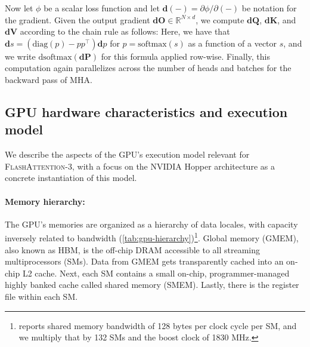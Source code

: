 \documentclass{article}
\newcommand{\diag}{\mathrm{diag}}
\newcommand{\softmax}{\mathrm{softmax}}
\newcommand{\dsoftmax}{\mathrm{dsoftmax}}
\newcommand{\vQ}{\mathbf{Q}}
\newcommand{\vK}{\mathbf{K}}
\newcommand{\vV}{\mathbf{V}}
\newcommand{\vdQ}{\mathbf{dQ}}
\newcommand{\vdK}{\mathbf{dK}}
\newcommand{\vdV}{\mathbf{dV}}
\newcommand{\vdS}{\mathbf{dS}}
\newcommand{\vP}{\mathbf{P}}
\newcommand{\vdP}{\mathbf{dP}}
\newcommand{\vdO}{\mathbf{dO}}
\newcommand{\fat}{\textsc{FlashAttention-3}\xspace}  %
\begin{document}
Now let $\phi$ be a scalar loss function and let $\mathbf{d}(-) = \partial \phi / \partial (-)$ be notation for the gradient.
Given the output gradient $\vdO \in \mathbb{R}^{N \times d}$, we compute $\vdQ$, $\vdK$, and $\vdV$ according to the chain rule as follows:
\iftoggle{arxiv}{
\begin{align*}
  \vdV &= \vP^\top \vdO \in \mathbb{R}^{N \times d} \\
  \vdP &= \vdO \vV^\top \in \mathbb{R}^{N \times N} \\
  \vdS &= \dsoftmax (\vdP) \in \mathbb{R}^{N \times N} \\
  \vdQ &= \alpha \vdS \vK \in \mathbb{R}^{N \times d} \\
  \vdK &= \alpha \vdS^\top \vQ \in \mathbb{R}^{N \times d},
\end{align*}
}{
\begin{align*}
  \vdV &= \vP^\top \vdO \in \mathbb{R}^{N \times d}, \: &\vdP &= \vdO \vV^\top \in \mathbb{R}^{N \times N}, \\
  \vdS &= \dsoftmax (\vdP) \in \mathbb{R}^{N \times N}, \: &\vdQ &= \alpha \vdS \vK \in \mathbb{R}^{N \times d}, \qquad \vdK = \alpha \vdS^\top \vQ \in \mathbb{R}^{N \times d}.
\end{align*}
}
Here, we have that $\mathbf{d}s = (\diag(p) - p p^\top)\mathbf{d}p$ for $p = \softmax(s)$ as a function of a vector $s$, and we write $\dsoftmax(\vdP)$ for this formula applied row-wise.
Finally, this computation again parallelizes across the number of heads and batches for the backward pass of MHA.

\subsection{GPU hardware characteristics and execution model}
\label{subsec:hardware}

We describe the aspects of the GPU's execution model relevant for \fat, with a focus on the NVIDIA Hopper architecture as a concrete instantiation of this model.

\paragraph{Memory hierarchy:} The GPU's memories are organized as a hierarchy of data locales, with capacity inversely related to bandwidth (\cref{tab:gpu-hierarchy})\footnote{\citet{luo2024benchmarking} reports shared memory bandwidth of 128 bytes per clock cycle per SM, and we multiply that by 132 SMs and the boost clock of 1830 MHz.}.
Global memory (GMEM), also known as HBM, is the off-chip DRAM accessible to all streaming multiprocessors (SMs).
Data from GMEM gets transparently cached into an on-chip L2 cache.
Next, each SM contains a small on-chip, programmer-managed highly banked cache called shared memory (SMEM). 
Lastly, there is the register file within each SM.
\end{document}
